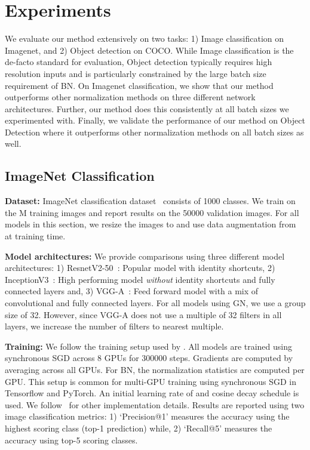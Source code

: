 \documentclass[10pt,twocolumn,letterpaper]{article}
\newcommand{\batchnorm}{BN}
\begin{document}
\section{Experiments}
We evaluate our method extensively on two tasks: 1) Image classification on Imagenet, and 2) Object detection on COCO. While Image classification is the de-facto standard for evaluation, Object detection typically requires high resolution inputs and is particularly constrained by the large batch size requirement of \batchnorm{}. On Imagenet classification, we show that our method outperforms other normalization methods on three different network architectures. Further, our method does this consistently at all batch sizes we experimented with. Finally, we validate the performance of our method on Object Detection where it outperforms other normalization methods on all batch sizes as well.


\subsection{ImageNet Classification} \label{sec:imagenet}

\noindent
\textbf{Dataset:} ImageNet classification dataset~\cite{imagenet} consists  of 1000 classes. We train on the M training images and report results on the 50000 validation images. For all models in this section, we resize the images to  and use data augmentation from~\cite{szegedy2017inception} at training time.

\medskip
\noindent
\textbf{Model architectures:} We provide comparisons using three different model architectures: 1) ResnetV2-50~\cite{resnetsv2}: Popular model with identity shortcuts, 2) InceptionV3~\cite{szegedy2016rethinking}: High performing model \emph{without} identity shortcuts and fully connected layers and, 3) VGG-A~\cite{vggnet}: Feed forward model with a mix of convolutional and fully connected layers. For all models using GN, we use a group size of 32. However, since VGG-A does not use a multiple of 32 filters in all layers, we increase the number of filters to nearest multiple.

\medskip
\noindent
\textbf{Training:}
We follow the training setup used by \citet{resnets}. All models are trained using synchronous SGD across 8 GPUs for 300000 steps. Gradients are computed by averaging across all GPUs. For BN, the normalization statistics are computed per GPU. This setup is common for multi-GPU training using synchronous SGD in Tensorflow and PyTorch.
An initial learning rate of  and cosine decay schedule is used. We follow~\cite{resnets, resnetsv2} for other implementation details. Results are reported using two image classification metrics: 1) `Precision@1' measures the accuracy using the highest scoring class (top-1 prediction) while, 2) `Recall@5' measures the accuracy using top-5 scoring classes.
\end{document}
